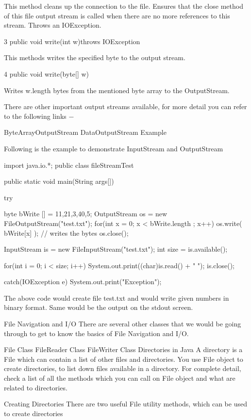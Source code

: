 This method cleans up the connection to the file. Ensures that the close method of this file output stream is called when there are no more references to this stream. Throws an IOException.

3
 public void write(int w)throws IOException{}

This methods writes the specified byte to the output stream.

4
 public void write(byte[] w)

Writes w.length bytes from the mentioned byte array to the OutputStream.

There are other important output streams available, for more detail you can refer to the following links −

ByteArrayOutputStream
DataOutputStream
Example

Following is the example to demonstrate InputStream and OutputStream

import java.io.*;
public class fileStreamTest {

   public static void main(String args[]) {

      try {
         byte bWrite [] = {11,21,3,40,5};
         OutputStream os = new FileOutputStream("test.txt");
         for(int x = 0; x < bWrite.length ; x++) {
            os.write( bWrite[x] );   // writes the bytes
         }
         os.close();

         InputStream is = new FileInputStream("test.txt");
         int size = is.available();

         for(int i = 0; i < size; i++) {
            System.out.print((char)is.read() + "  ");
         }
         is.close();
      }catch(IOException e) {
         System.out.print("Exception");
      }
   }
}
The above code would create file test.txt and would write given numbers in binary format. Same would be the output on the stdout screen.

File Navigation and I/O
There are several other classes that we would be going through to get to know the basics of File Navigation and I/O.

File Class
FileReader Class
FileWriter Class
Directories in Java
A directory is a File which can contain a list of other files and directories. You use File object to create directories, to list down files available in a directory. For complete detail, check a list of all the methods which you can call on File object and what are related to directories.

Creating Directories
There are two useful File utility methods, which can be used to create directories

